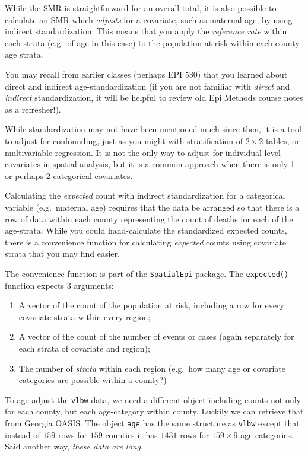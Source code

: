 \documentclass[
]{book}
\providecommand{\tightlist}{%
  \setlength{\itemsep}{0pt}\setlength{\parskip}{0pt}}
\begin{document}
While the SMR is straightforward for an overall total, it is also possible to calculate an SMR which \emph{adjusts} for a covariate, such as maternal age, by using indirect standardization. This means that you apply the \emph{reference rate} within each strata (e.g.~of age in this case) to the population-at-risk within each county-age strata.

You may recall from earlier classes (perhaps EPI 530) that you learned about direct and indirect age-standardization (if you are not familiar with \emph{direct} and \emph{indirect} standardization, it will be helpful to review old Epi Methods course notes as a refresher!).

While standardization may not have been mentioned much since then, it is a tool to adjust for confounding, just as you might with stratification of \(2\times 2\) tables, or multivariable regression. It is not the only way to adjust for individual-level covariates in spatial analysis, but it is a common approach when there is only 1 or perhaps 2 categorical covariates.

Calculating the \emph{expected} count with indirect standardization for a categorical variable (e.g.~maternal age) requires that the data be arranged so that there is a row of data within each county representing the count of deaths for each of the age-strata. While you could hand-calculate the standardized expected counts, there is a convenience function for calculating \emph{expected} counts using covariate strata that you may find easier.

The convenience function is part of the \texttt{SpatialEpi} package. The \texttt{expected()} function expects 3 arguments:

\begin{enumerate}
\def\labelenumi{\arabic{enumi}.}
\tightlist
\item
  A vector of the count of the population at risk, including a row for every covariate strata within every region;
\item
  A vector of the count of the number of events or cases (again separately for each strata of covariate and region);
\item
  The number of \emph{strata} within each region (e.g.~how many age or covariate categories are possible within a county?)
\end{enumerate}

To age-adjust the \texttt{vlbw} data, we need a different object including counts not only for each county, but each age-category within county. Luckily we can retrieve that from Georgia OASIS. The object \texttt{age} has the same structure as \texttt{vlbw} except that instead of \(159\) rows for \(159\) counties it has \(1431\) rows for \(159\times 9\) age categories. Said another way, \emph{these data are long}.
\end{document}
